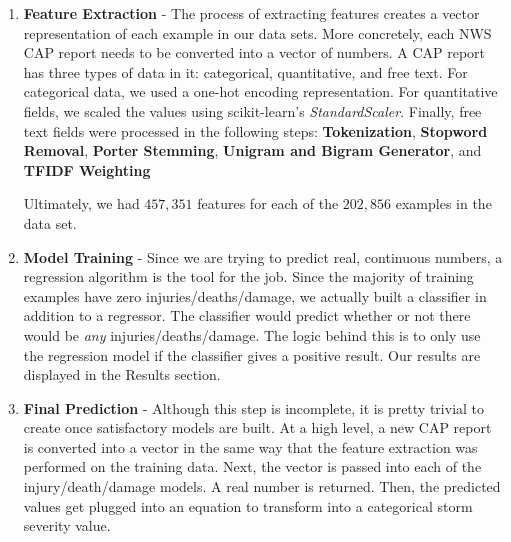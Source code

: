 \documentclass[landscape,final,paperwidth=36in,paperheight=24in,fontscale=0.55]{baposter}
\begin{document}
\begin{poster}
{\begin{multicols*}{2}
\begin{enumerate}
		\item \textbf{Feature Extraction} - The process of extracting features creates a vector representation of each example in our data sets. More concretely, each NWS CAP report needs to be converted into a vector of numbers. A CAP report has three types of data in it: categorical, quantitative, and free text. For categorical data, we used a one-hot encoding representation. For quantitative fields, we scaled the values using scikit-learn's \textit{StandardScaler}. Finally, free text fields were processed in the following steps:
		\textbf{Tokenization}, \textbf{Stopword Removal}, \textbf{Porter Stemming}, \textbf{Unigram and Bigram Generator}, and \textbf{TFIDF Weighting}
		
		Ultimately, we had $457,351$ features for each of the $202,856$ examples in the data set.

		\item \textbf{Model Training} - Since we are trying to predict real, continuous numbers, a regression algorithm is the tool for the job. Since the majority of training examples have zero injuries/deaths/damage, we actually built a classifier in addition to a regressor. The classifier would predict whether or not there would be \textit{any} injuries/deaths/damage. The logic behind this is to only use the regression model if the classifier gives a positive result. Our results are displayed in the Results section.

		\item \textbf{Final Prediction} - Although this step is incomplete, it is pretty trivial to create once satisfactory models are built. At a high level, a new CAP report is converted into a vector in the same way that the feature extraction was performed on the training data. Next, the vector is passed into each of the injury/death/damage models. A real number is returned. Then, the predicted values get plugged into an equation to transform into a categorical storm severity value.
	 \end{enumerate}
 \end{multicols*}
  }


\end{poster}
\end{document}
